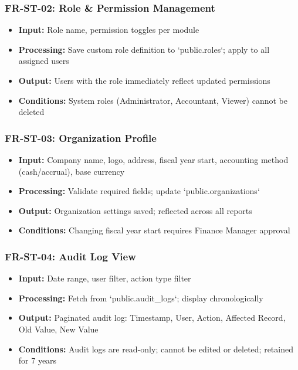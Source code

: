 \documentclass[journal, a4paper, onecolumn, 12pt]{IEEEtran}
\begin{document}
\subsubsection{FR-ST-02: Role \& Permission Management}
\begin{itemize}[leftmargin=*]
\item \textbf{Input:} Role name, permission toggles per module
\item \textbf{Processing:} Save custom role definition to `public.roles`; apply to all assigned users
\item \textbf{Output:} Users with the role immediately reflect updated permissions
\item \textbf{Conditions:} System roles (Administrator, Accountant, Viewer) cannot be deleted
\end{itemize}

\subsubsection{FR-ST-03: Organization Profile}
\begin{itemize}[leftmargin=*]
\item \textbf{Input:} Company name, logo, address, fiscal year start, accounting method (cash/accrual), base currency
\item \textbf{Processing:} Validate required fields; update `public.organizations`
\item \textbf{Output:} Organization settings saved; reflected across all reports
\item \textbf{Conditions:} Changing fiscal year start requires Finance Manager approval
\end{itemize}

\subsubsection{FR-ST-04: Audit Log View}
\begin{itemize}[leftmargin=*]
\item \textbf{Input:} Date range, user filter, action type filter
\item \textbf{Processing:} Fetch from `public.audit\_logs`; display chronologically
\item \textbf{Output:} Paginated audit log: Timestamp, User, Action, Affected Record, Old Value, New Value
\item \textbf{Conditions:} Audit logs are read-only; cannot be edited or deleted; retained for 7 years
\end{itemize}
\end{document}
